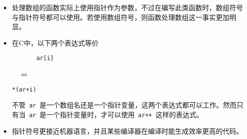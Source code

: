 \begin{frame}[fragile]
\begin{itemize}
\item 处理数组的函数实际上使用指针作为参数，不过在编写此类函数时，数组符号与指针符号都可以使用。若使用数组符号，则函数处理数组这一事实更加明显。\\[0.1in]
  
\item 在C中，以下两个表达式等价

\begin{minipage}{0.35\textwidth}
\begin{lstlisting}
       ar[i]
\end{lstlisting}
\end{minipage}
~~$\Longleftrightarrow$~~
\begin{minipage}{0.35\textwidth}
\begin{lstlisting}
*(ar+i)
\end{lstlisting}
\end{minipage}

不管\lstinline| ar |是一个数组名还是一个指针变量，这两个表达式都可以工作。然而只有当\lstinline| ar |是一个指针变量时，才可以使用\lstinline| ar++ |这样的表达式。
\\[0.1in]
\item
指针符号更接近机器语言，并且某些编译器在编译时能生成效率更高的代码。
\end{itemize}
\end{frame}
